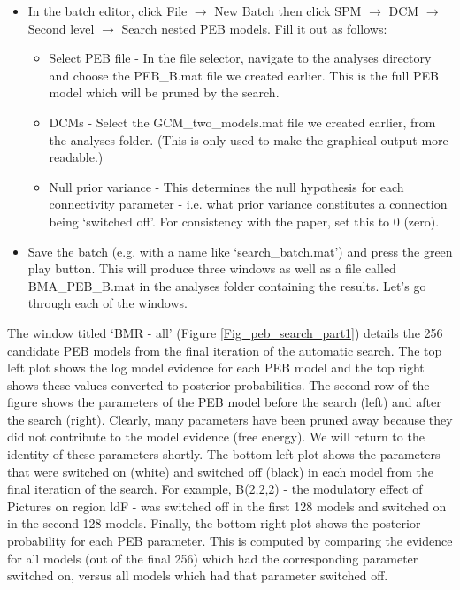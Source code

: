 \documentclass{article}
\begin{document}
\begin{itemize}
    \item In the batch editor, click File $\rightarrow$ New Batch then click SPM $\rightarrow$ DCM $\rightarrow$ Second level $\rightarrow$ Search nested PEB models. Fill it out as follows:
    \begin{itemize}
        \item Select PEB file - In the file selector, navigate to the analyses directory and choose the PEB\_B.mat file we created earlier. This is the full PEB model which will be pruned by the search.
        \item DCMs - Select the GCM\_two\_models.mat file we created earlier, from the analyses folder. (This is only used to make the graphical output more readable.)
        \item Null prior variance - This determines the null hypothesis for each connectivity parameter - i.e. what prior variance constitutes a connection being `switched off'. For consistency with the paper, set this to 0 (zero).
    \end{itemize}
    \item Save the batch (e.g. with a name like `search\_batch.mat') and press the green play button. This will produce three windows as well as a file called BMA\_PEB\_B.mat in the analyses folder containing the results. Let's go through each of the windows.
\end{itemize}

The window titled `BMR - all' (Figure \ref{Fig_peb_search_part1}) details the 256 candidate PEB models from the final iteration of the automatic search. The top left plot shows the log model evidence for each PEB model and the top right shows these values converted to posterior probabilities. The second row of the figure shows the parameters of the PEB model before the search (left) and after the search (right). Clearly, many parameters have been pruned away because they did not contribute to the model evidence (free energy). We will return to the identity of these parameters shortly. The bottom left plot shows the parameters that were switched on (white) and switched off (black) in each model from the final iteration of the search. For example, B(2,2,2) - the modulatory effect of Pictures on region ldF - was switched off in the first 128 models and switched on in the second 128 models. Finally, the bottom right plot shows the posterior probability for each PEB parameter. This is computed by comparing the evidence for all models (out of the final 256) which had the corresponding parameter switched on, versus all models which had that parameter switched off.
\end{document}
